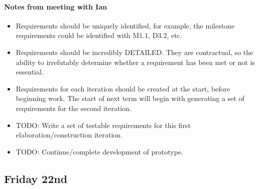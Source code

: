 \paragraph{Notes from meeting with Ian}
\begin{itemize}
\item Requirements should be uniquely identified, for example, the milestone
  requirements could be identified with M1.1, D3.2, etc.
\item Requirements should be incredibly DETAILED. They are contractual, so the
  ability to irrefutably determine whether a requirement has been met or not is
  essential.
\item Requirements for each iteration should be created at the start, before
  beginning work. The start of next term will begin with generating a set of
  requirements for the second iteration.
\item TODO: Write a set of testable requirements for this first
  elaboration/construction iteration.
\item TODO: Continue/complete development of prototype.
\end{itemize}

\subsection{Friday 22nd}
